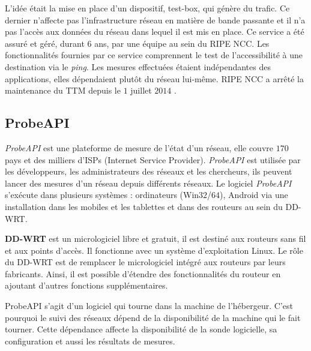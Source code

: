 L'idée était la mise en place d'un dispositif, test-box,  qui génère du trafic. Ce dernier n'affecte pas l'infrastructure réseau en matière de bande passante et il n'a pas l'accès aux données du réseau dans lequel il est mis en place.
Ce service a été assuré et géré, durant $6$ ans, par une équipe au sein du RIPE NCC. Les fonctionnalités fournies par ce service comprennent le test de l'accessibilité à une destination via le \textit{ping}. Les mesures effectuées étaient indépendantes des applications, elles dépendaient plutôt du  réseau lui-même. RIPE NCC   a  arrêté la maintenance du  TTM depuis le $1$ juillet $2014$ \cite{TTM}.


\subsection{ProbeAPI}

\textit{ProbeAPI} \cite{PROBEAPI} est  une plateforme de mesure de l'état  d'un réseau,  elle  couvre $170$ pays et des milliers d'ISPs (Internet Service Provider). \textit{ProbeAPI} est utilisée par les développeurs, les administrateurs des réseaux et les chercheurs, ils peuvent lancer des mesures d'un réseau depuis différents réseaux.
Le logiciel \textit{ProbeAPI}  s'exécute dans plusieurs systèmes :  ordinateurs (Win$32$/$64$), Android via une installation dans les mobiles et les tablettes et   dans des routeurs au sein du DD-WRT.
\begin{tcolorbox}
	\textbf{DD-WRT} est un micrologiciel libre et gratuit, il est destiné aux routeurs sans fil et aux points d'accès. Il fonctionne  avec un système d'exploitation Linux. Le rôle du DD-WRT est de remplacer le micrologiciel intégré aux routeurs par leurs fabricants. Ainsi, il est possible  d'étendre des fonctionnalités du routeur en ajoutant d'autres fonctions supplémentaires.
\end{tcolorbox}


ProbeAPI s'agit d'un logiciel qui tourne dans la machine de l'hébergeur. C'est pourquoi le suivi des réseaux dépend de la disponibilité de la machine qui le fait  tourner. Cette dépendance  affecte la disponibilité de la sonde logicielle, sa configuration et aussi les résultats de mesures.

